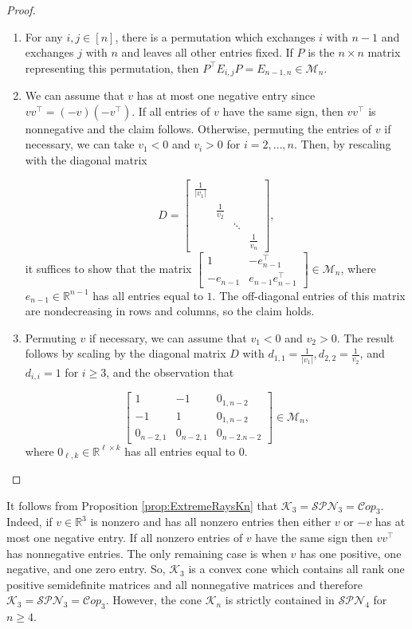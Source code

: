 \documentclass{amsart}
\newcommand{\bbR}{\mathbb{R}}
\newcommand{\cM}{\mathcal{M}}
\newcommand{\cK}{\mathcal{K}}
\newcommand{\Cop}{\mathcal{C}op}
\newcommand{\SPN}{\mathcal{SPN}}
\theoremstyle{definition}
\begin{document}
\begin{proof}
\begin{enumerate} 
\item For any $i,j \in [n]$, there is a permutation which exchanges $i$ with $n-1$ and exchanges $j$ with $n$ and leaves all other entries fixed. If $P$ is the $n \times n$ matrix representing this permutation, then $P^\top E_{i,j}P = E_{n-1,n} \in \cM_n$.

\item We can assume that $v$ has at most one negative entry since $vv^\top  = (-v)(-v^\top)$. If all entries of $v$ have the same sign, then $vv^\top$ is nonnegative and the claim follows.  Otherwise, permuting the entries of $v$ if necessary, we can take $v_1 < 0$ and $v_i > 0$ for $i = 2, \ldots, n$. Then, by rescaling with the diagonal matrix

\[D = \begin{bmatrix} \frac{1}{|v_1|} & & &\\ & \frac{1}{v_2} & & \\ && \ddots & \\ & & & \frac{1}{v_n} \end{bmatrix},\]
%
it suffices to show that the matrix $\begin{bmatrix}1 & -e_{n-1}^\top \\ -e_{n-1} & e_{n-1}e_{n-1}^\top\end{bmatrix} \in \cM_{n}$, where $e_{n-1} \in \bbR^{n-1}$ has all entries equal to $1$. The off-diagonal entries of this matrix are nondecreasing in rows and columns, so the claim holds. 

\item Permuting $v$ if necessary, we can assume that $v_1 < 0$ and $v_2 > 0$. The result follows by scaling by the diagonal matrix $D$ with $d_{1,1} = \frac{1}{|v_1|}, d_{2,2} = \frac{1}{v_2}$, and $d_{i,i} = 1$ for $i \geq 3$, and the observation that 

\[\begin{bmatrix} 1 & -1 & 0_{1, n-2}\\ -1 & 1 & 0_{1,n-2}\\ 0_{n-2,1} &0_{n-2,1} & 0_{n-2.n-2}\end{bmatrix} \in \cM_n,\]
%
where $0_{\ell, k} \in \bbR^{\ell \times k}$ has all entries equal to 0. 
\end{enumerate}
\end{proof}

It follows from Proposition \ref{prop:ExtremeRaysKn} that $\cK_3 = \SPN_3 = \Cop_3$. Indeed, if $v \in \bbR^3$ is nonzero and has all nonzero entries then either $v$ or $-v$ has at most one negative entry. If all nonzero entries of $v$ have the same sign then $vv^\top$ has nonnegative entries. The only remaining case is when $v$ has one positive, one negative, and one zero entry. So, $\cK_3$ is a convex cone which contains all rank one positive semidefinite matrices and all nonnegative matrices and therefore $\cK_3 = \SPN_3 = \Cop_3$. However, the cone $\cK_n$ is strictly contained in $\SPN_4$ for $n\geq 4. $
\end{document}
